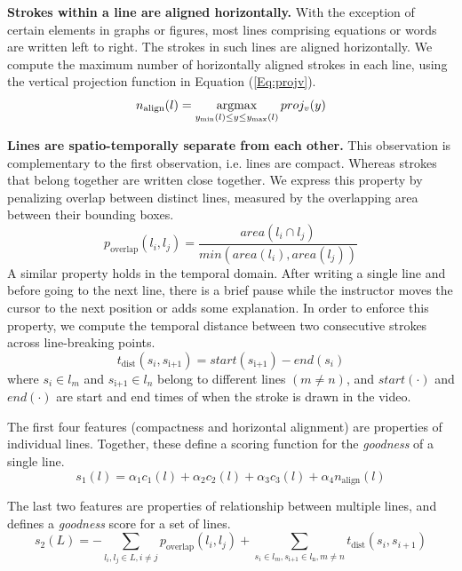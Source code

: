 \textbf{Strokes within a line are aligned horizontally.} With the exception of certain elements in graphs or figures, most lines comprising equations or words are written left to right. The strokes in such lines are aligned horizontally. We compute the maximum number of horizontally aligned strokes in each line, using the vertical projection function in Equation (\ref{Eq:projv}).
\begin{equation}
n_\text{align}(l) = \operatorname*{argmax}_{y_\text{min}(l) \le y \le y_\text{max}(l)} proj_v(y)
\label{Eq:n_align}
\end{equation}

\textbf{Lines are spatio-temporally separate from each other.} This observation is complementary to the first observation, i.e. lines are compact. Whereas strokes that belong together are written close together. We express this property by penalizing overlap between distinct lines, measured by the overlapping area between their bounding boxes.
\begin{equation}
p_\text{overlap}(l_i, l_j) = \frac{area(l_i\cap l_j)}{min(area(l_i), area(l_j))}
\end{equation}
A similar property holds in the temporal domain. After writing a single line and before going to the next line, there is a brief pause while the instructor moves the cursor to the next position or adds some explanation. In order to enforce this property, we compute the temporal distance between two consecutive strokes across line-breaking points.
\begin{equation}
t_\text{dist}(s_i, s_\text{i+1}) = start(s_\text{i+1}) - end(s_i)
\end{equation}
where $s_i \in l_m$ and $s_\text{i+1} \in l_n$ belong to different lines $(m \neq n)$, and $start(\cdot)$ and $end(\cdot)$ are start and end times of when the stroke is drawn in the video.

The first four features (compactness and horizontal alignment) are properties of individual lines. Together, these define a scoring function for the \textit{goodness} of a single line.
\begin{equation}
s_1(l) = \alpha_1c_1(l) + \alpha_2c_2(l) + \alpha_3c_3(l) + \alpha_4n_\text{align}(l)
\end{equation}

The last two features are properties of relationship between multiple lines, and defines a \textit{goodness} score for a set of lines. 
\begin{equation}
s_2(L) = -\sum \limits_{l_i,l_j\in L, i\neq j}p_\text{overlap}(l_i, l_j) +\sum \limits_{s_i\in l_m, s_\text{i+1} \in l_\text{n}, m \neq n}t_\text{dist}(s_i, s_{i+1})
\end{equation}

